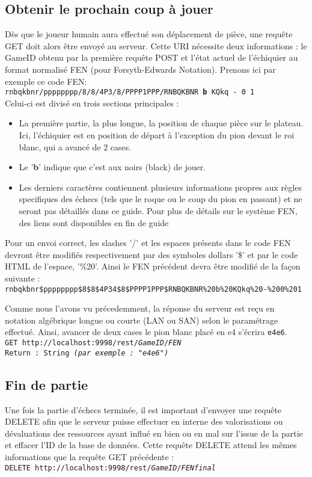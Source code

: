 \documentclass[a4paper,11pt]{article}
\begin{document}
\subsection{Obtenir le prochain coup à jouer}
        Dès que le joueur humain aura effectué son déplacement de pièce, une requête GET doit alors être envoyé au serveur. Cette URI nécessite deux informations : le GameID obtenu par la première requête POST et l'état actuel de l'échiquier au format normalisé FEN (pour Forsyth-Edwards Notation). Prenons ici par exemple ce code FEN: 
\\{\tt rnbqkbnr/pppppppp/8/8/4P3/8/PPPP1PPP/RNBQKBNR {\bf b} KQkq - 0 1}\\
Celui-ci est divisé en trois sections principales :
\begin{itemize}
   \item La première partie, la plus longue, la position de chaque pièce sur le plateau. Ici, l'échiquier est en position de départ à l'exception du pion devant le roi blanc, qui a avancé de 2 cases.
   \item Le '{\bf b}' indique que c'est aux noirs (black) de jouer.
   \item Les derniers caractères contiennent plusieurs informations propres aux règles specifiques des échecs (tels que le roque ou le coup du pion en passant) et ne seront pas détaillés dans ce guide. Pour plus de détails sur le système FEN, des liens sont disponibles en fin de guide 
\end{itemize}
        Pour un envoi correct, les slashes '/' et les espaces présents dans le code FEN devront être modifiés respectivement par des symboles dollars '\$' et par le code HTML de l'espace, '\%20'. Ainsi le FEN précédent devra être modifié de la façon suivante :
\\{\tt rnbqkbnr\$pppppppp\$8\$8\$4P34\$8\$PPPP1PPP\$RNBQKBNR\%20b\%20KQkq\%20-\%200\%201}
        
        Comme nous l'avons vu précedemment, la réponse du serveur est reçu en notation algébrique longue ou courte (LAN ou SAN) selon le paramétrage effectué. Ainsi, avancer de deux cases le pion blanc placé en e4 s'écrira {\tt e4e6}.
\\{\tt GET http://localhost:9998/rest/{\em GameID}/{\em FEN}\\
Return : String {\em (par exemple : "e4e6")} }\\
        


\subsection{Fin de partie}
        Une fois la partie d'échecs terminée, il est important d'envoyer une requête DELETE afin que le serveur puisse effectuer en interne des valorisations ou dévaluations des ressources ayant influé en bien ou en mal sur l'issue de la partie et effacer l'ID de la base de données. Cette requête DELETE attend les mêmes informations que la requête GET précédente : 
\\{\tt DELETE http://localhost:9998/rest/{\em GameID}/{\em FENfinal}}
\end{document}
